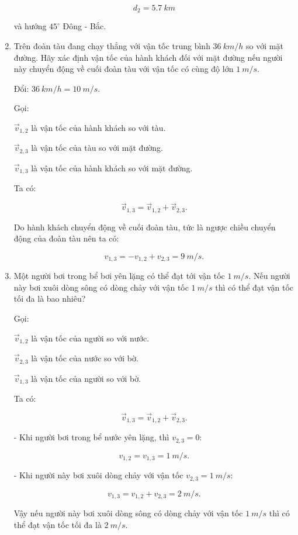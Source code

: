\begin{enumerate}[label=\bfseries Câu \arabic*:]
{		$$d_2 = \SI{5,7}{km}$$
		
		và hướng $45^\circ$ Đông - Bắc.
	}
	
	\item {}
	
	\cauhoi
	{   
		Trên đoàn tàu đang chạy thẳng với vận tốc trung bình $\SI{36}{km/h}$ so với mặt đường. Hãy xác định vận tốc của hành khách đối với mặt đường nếu người này chuyển động về cuối đoàn tàu với vận tốc có cùng độ lớn $\SI{1}{m/s}$.
	}
	\loigiai
	{
		
		Đổi: $\SI{36}{km/h} = \SI{10}{m/s}$.
		
		Gọi:
		
		$\vec v_{1,2}$ là vận tốc của hành khách so với tàu.
		
		$\vec v_{2,3}$ là vận tốc của tàu so với mặt đường.
		
		$\vec v_{1,3}$ là vận tốc của hành khách so với mặt đường.
		
		Ta có:
		
		$$\vec v_{1,3} = \vec v_{1,2} + \vec v_{2,3}.$$
		
		Do hành khách chuyển động về cuối đoàn tàu, tức là ngược chiều chuyển động của đoàn tàu nên ta có:
		
		$$v_{1,3} = - v_{1,2} + v_{2,3} = \SI{9}{m/s}.$$
	
		
	}
	\item {}
	
	\cauhoi
	{
		Một người bơi trong bể bơi yên lặng có thể đạt tới vận tốc $\SI{1}{m/s}$. Nếu người này bơi xuôi dòng sông có dòng chảy với vận tốc $\SI{1}{m/s}$ thì có thể đạt vận tốc tối đa là bao nhiêu?
	}
	\loigiai
	{
		Gọi:
		
		$\vec v_{1,2}$ là vận tốc của người so với nước.
		
		$\vec v_{2,3}$ là vận tốc của nước so với bờ.
		
		$\vec v_{1,3}$ là vận tốc của người so với bờ.
		
		Ta có:
		
		$$\vec v_{1,3} = \vec v_{1,2} + \vec v_{2,3}.$$
		
		- Khi người bơi trong bể nước yên lặng, thì $v_{2,3} = 0$:
		
		$$v_{1,2} = v_{1,3} = \SI{1}{m/s}.$$
		
		- Khi người này bơi xuôi dòng chảy với vận tốc $v_{2,3} = \SI{1}{m/s}$:
		
		
		$$v_{1,3} = v_{1,2} + v_{2,3} = \SI{2}{m/s}.$$
		
		Vậy nếu người này bơi xuôi dòng sông có dòng chảy với vận tốc $\SI{1}{m/s}$ thì có thể đạt vận tốc tối đa là $\SI{2}{m/s}.$
		
}
\end{enumerate}
